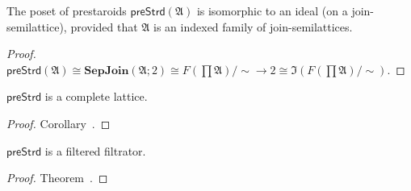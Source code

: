 \begin{cor}
  The poset of prestaroids
  $\mathsf{preStrd} (\mathfrak{A})$ is isomorphic to an ideal
  (on a join-semilattice), provided that $\mathfrak{A}$ is an indexed family
  of join-semilattices.
\end{cor}

\begin{proof}
  $\mathsf{preStrd} (\mathfrak{A}) \cong \mathbf{SepJoin} (\mathfrak{A}; 2)
  \cong F \left( \prod \mathfrak{A} \right) / \sim \rightarrow 2 \cong
  \mathfrak{I} \left( F \left( \prod \mathfrak{A} \right) / \sim \right)$.
\end{proof}


\begin{cor}
$\mathsf{preStrd}$ is a complete lattice.
\end{cor}

\begin{proof}
Corollary~.
\end{proof}

\begin{cor}
$\mathsf{preStrd}$ is a filtered filtrator.
\end{cor}

\begin{proof}
Theorem~.
\end{proof}

